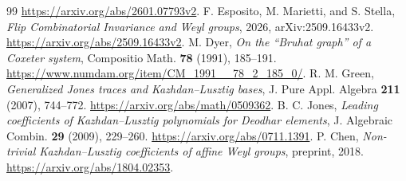\documentclass[11pt]{article}
\theoremstyle{definition}\newtheorem{definition}[theorem]{Definition}
\theoremstyle{remark}\newtheorem{remark}[theorem]{Remark}
\begin{document}
\begin{thebibliography}{99}
\url{https://arxiv.org/abs/2601.07793v2}.
 F. Esposito, M. Marietti, and S. Stella,
\emph{Flip Combinatorial Invariance and Weyl groups}, 2026,
arXiv:2509.16433v2. \url{https://arxiv.org/abs/2509.16433v2}.
 M. Dyer, \emph{On the ``Bruhat graph'' of a Coxeter
system}, Compositio Math. \textbf{78} (1991), 185--191.
\url{https://www.numdam.org/item/CM_1991__78_2_185_0/}.
 R. M. Green, \emph{Generalized Jones traces and
Kazhdan--Lusztig bases}, J. Pure Appl. Algebra \textbf{211} (2007),
744--772. \url{https://arxiv.org/abs/math/0509362}.
 B. C. Jones, \emph{Leading coefficients of
Kazhdan--Lusztig polynomials for Deodhar elements}, J. Algebraic
Combin. \textbf{29} (2009), 229--260.
\url{https://arxiv.org/abs/0711.1391}.
 P. Chen, \emph{Non-trivial Kazhdan--Lusztig
coefficients of affine Weyl groups}, preprint, 2018.
\url{https://arxiv.org/abs/1804.02353}.
\end{thebibliography}
\end{document}
